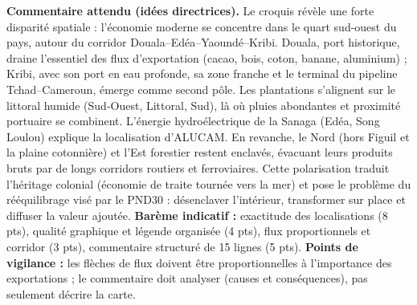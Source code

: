 \documentclass[11pt]{article}
\newcommand{\cle}[1]{{\popxbold\color{popdark}#1}}
\begin{document}
\begin{corrige}
\textbf{Commentaire attendu (idées directrices).} Le croquis révèle une forte disparité spatiale : l'économie moderne se concentre dans le quart sud-ouest du pays, autour du corridor Douala--Edéa--Yaoundé--Kribi. Douala, port historique, draine l'essentiel des flux d'exportation (cacao, bois, coton, banane, aluminium) ; Kribi, avec son port en eau profonde, sa zone franche et le terminal du pipeline Tchad--Cameroun, émerge comme second pôle. Les plantations s'alignent sur le littoral humide (Sud-Ouest, Littoral, Sud), là où pluies abondantes et proximité portuaire se combinent. L'énergie hydroélectrique de la Sanaga (Edéa, Song Loulou) explique la localisation d'ALUCAM. En revanche, le Nord (hors Figuil et la plaine cotonnière) et l'Est forestier restent enclavés, évacuant leurs produits bruts par de longs corridors routiers et ferroviaires. Cette \cle{polarisation} traduit l'héritage colonial (économie de traite tournée vers la mer) et pose le problème du rééquilibrage visé par le PND30 : désenclaver l'intérieur, transformer sur place et diffuser la valeur ajoutée.
\textbf{Barème indicatif :} exactitude des localisations (8 pts), qualité graphique et légende organisée (4 pts), flux proportionnels et corridor (3 pts), commentaire structuré de 15 lignes (5 pts).
\textbf{Points de vigilance :} les flèches de flux doivent être proportionnelles à l'importance des exportations ; le commentaire doit analyser (causes et conséquences), pas seulement décrire la carte.
\end{corrige}
\end{document}
